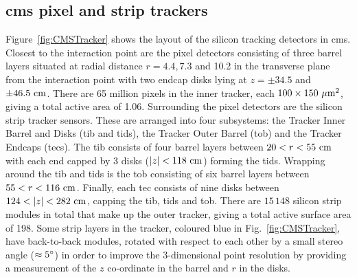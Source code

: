 \subsection{\acrshort{cms} pixel and strip trackers}
\label{ssec:Tracker}

Figure~\ref{fig:CMSTracker} shows the layout of the silicon tracking detectors in \acrshort{cms}. 
Closest to the interaction point are the pixel detectors consisting of three barrel layers situated at radial distance $r=4.4, 7.3$ and 10.2\cm{} in the transverse plane from the interaction point with two endcap disks lying at $z=\pm34.5$ and $\pm46.5\mathrm{~cm}^{}$.  
There are 65 million pixels in the inner tracker, each $100\times150\mathrm{~\mu m}^{2}$, giving a total active area of 1.06\msq{}.
Surrounding the pixel detectors are the silicon strip tracker sensors. 
These are arranged into four subsystems: the Tracker Inner Barrel and Disks (\acrshort{tib} and \acrshort{tid}s), the Tracker Outer Barrel (\acrshort{tob}) and the Tracker Endcaps (\acrshort{tec}s).
The \acrshort{tib} consists of four barrel layers between $20<r<55\mathrm{~cm}^{}$ with each end capped by 3 disks ($|z|<118\mathrm{~cm}^{}$) forming the \acrshort{tid}s. 
Wrapping around the \acrshort{tib} and \acrshort{tid}s is the \acrshort{tob} consisting of six barrel layers between $55<r<116\mathrm{~cm}^{}$. 
Finally, each \acrshort{tec} consists of nine disks between $124<|z|<282\cm$, capping the \acrshort{tib}, \acrshort{tid}s and \acrshort{tob}.
There are $15\,148$ silicon strip modules in total that make up the outer tracker, giving a total active surface area of 198\msq{}. 
Some strip layers in the tracker, coloured blue in Fig.~\ref{fig:CMSTracker}, have back-to-back modules, rotated with respect to each other by a small stereo angle ($\approx5^\circ$) in order to improve the 3-dimensional point resolution by providing a measurement of the $z$ co-ordinate in the barrel and $r$ in the disks.

